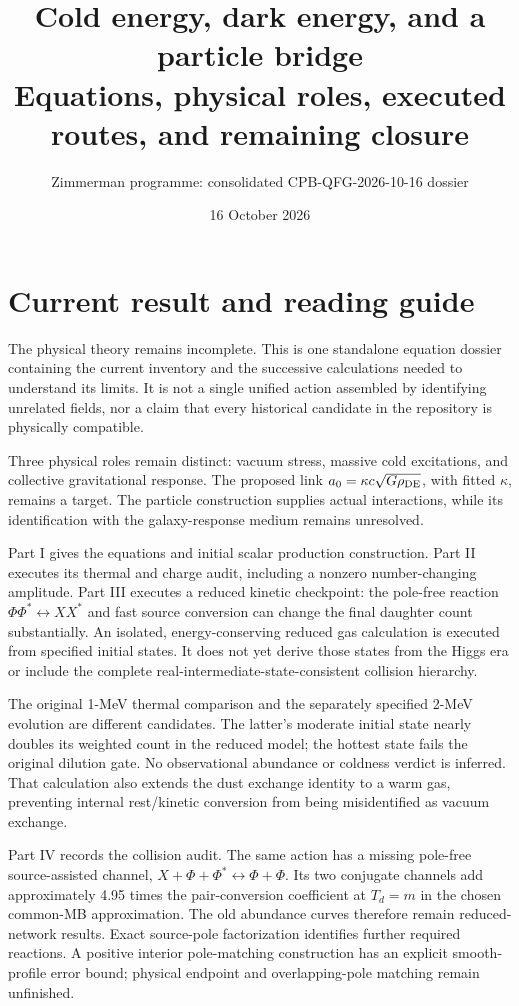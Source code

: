 \documentclass[11pt]{article}
\title{Cold energy, dark energy, and a particle bridge\\
Equations, physical roles, executed routes, and remaining closure}
\author{Zimmerman programme: consolidated CPB-QFG-2026-10-16 dossier}
\date{16 October 2026}
\begin{document}
\maketitle
\section*{Current result and reading guide}
The physical theory remains incomplete. This is one standalone equation
dossier containing the current inventory and the successive calculations
needed to understand its limits. It is not a single unified action assembled
by identifying unrelated fields, nor a claim that every historical candidate
in the repository is physically compatible.

Three physical roles remain distinct: vacuum stress, massive cold excitations,
and collective gravitational response. The proposed link
$a_0=\kappa c\sqrt{G\rho_{\rm DE}}$, with fitted $\kappa$, remains a target.
The particle construction supplies actual interactions, while its
identification with the galaxy-response medium remains unresolved.

Part I gives the equations and initial scalar production construction.
Part II executes its thermal and charge audit, including a nonzero
number-changing amplitude. Part III executes a reduced kinetic checkpoint:
the pole-free reaction $\Phi\Phi^*\leftrightarrow XX^*$ and fast source
conversion can change the final daughter count substantially. An isolated,
energy-conserving reduced gas calculation is executed from specified initial
states. It does not yet derive those states from the Higgs era or include
the complete real-intermediate-state-consistent collision hierarchy.

The original 1-MeV thermal comparison and the separately specified 2-MeV
evolution are different candidates. The latter's moderate initial state
nearly doubles its weighted count in the reduced model; the hottest state
fails the original dilution gate. No observational abundance or coldness
verdict is inferred. That calculation also extends the dust exchange
identity to a warm gas, preventing internal rest/kinetic conversion from
being misidentified as vacuum exchange.

Part IV records the collision audit. The same action has a missing
pole-free source-assisted channel, $X+\Phi+\Phi^*\leftrightarrow\Phi+\Phi$.
Its two conjugate channels add approximately 4.95 times the pair-conversion
coefficient at $T_d=m$ in the chosen common-MB approximation. The old
abundance curves therefore remain reduced-network results. Exact source-pole
factorization identifies further required reactions. A positive interior
pole-matching construction has an explicit smooth-profile error bound;
physical endpoint and overlapping-pole matching remain unfinished.
\end{document}

